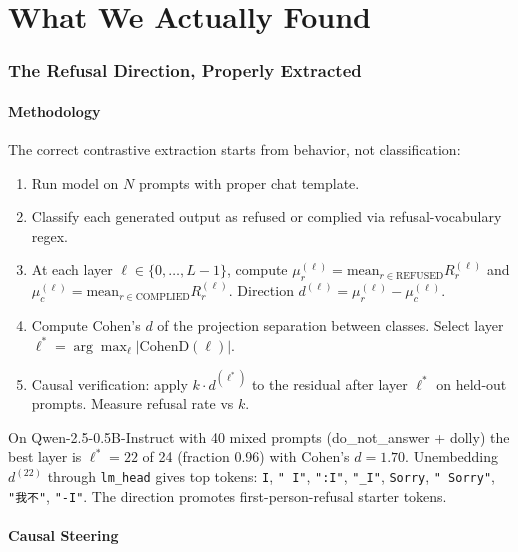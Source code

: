 \documentclass[11pt,a4paper]{article}
\begin{document}
\part{What We Actually Found}

\section{The Refusal Direction, Properly Extracted}

\subsection{Methodology}

The correct contrastive extraction starts from behavior, not classification:

\begin{enumerate}
\item Run model on $N$ prompts with proper chat template.
\item Classify each generated output as refused or complied via refusal-vocabulary regex.
\item At each layer $\ell \in \{0, \dots, L-1\}$, compute $\mu_r^{(\ell)} = \mathrm{mean}_{r \in \text{REFUSED}} R^{(\ell)}_r$ and $\mu_c^{(\ell)} = \mathrm{mean}_{r \in \text{COMPLIED}} R^{(\ell)}_r$. Direction $d^{(\ell)} = \mu_r^{(\ell)} - \mu_c^{(\ell)}$.
\item Compute Cohen's $d$ of the projection separation between classes. Select layer $\ell^* = \arg\max_\ell |\text{CohenD}(\ell)|$.
\item Causal verification: apply $k \cdot d^{(\ell^*)}$ to the residual after layer $\ell^*$ on held-out prompts. Measure refusal rate vs $k$.
\end{enumerate}

On Qwen-2.5-0.5B-Instruct with 40 mixed prompts (do\_not\_answer + dolly) the best layer is $\ell^* = 22$ of 24 (fraction 0.96) with Cohen's $d = 1.70$. Unembedding $d^{(22)}$ through \texttt{lm\_head} gives top tokens: \texttt{I}, \texttt{" I"}, \texttt{":I"}, \texttt{"\_I"}, \texttt{Sorry}, \texttt{" Sorry"}, \texttt{"我不"}, \texttt{"-I"}. The direction promotes first-person-refusal starter tokens.

\subsection{Causal Steering}
\end{document}
